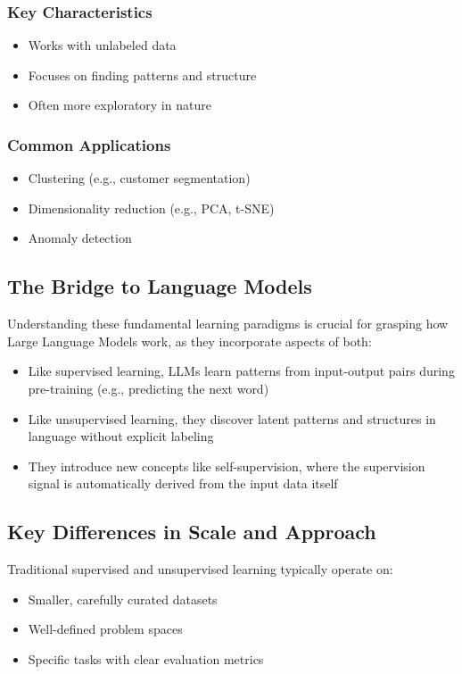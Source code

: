 \subsubsection{Key Characteristics}
\begin{itemize}[noitemsep]
    \item Works with unlabeled data
    \item Focuses on finding patterns and structure
    \item Often more exploratory in nature
\end{itemize}

\subsubsection{Common Applications}
\begin{itemize}[noitemsep]
    \item Clustering (e.g., customer segmentation)
    \item Dimensionality reduction (e.g., PCA, t-SNE)
    \item Anomaly detection
\end{itemize}

\subsection{The Bridge to Language Models}

Understanding these fundamental learning paradigms is crucial for grasping how Large Language Models work, as they incorporate aspects of both:

\begin{itemize}[noitemsep]
    \item Like supervised learning, LLMs learn patterns from input-output pairs during pre-training (e.g., predicting the next word)
    \item Like unsupervised learning, they discover latent patterns and structures in language without explicit labeling
    \item They introduce new concepts like self-supervision, where the supervision signal is automatically derived from the input data itself
\end{itemize}

\subsection{Key Differences in Scale and Approach}

Traditional supervised and unsupervised learning typically operate on:
\begin{itemize}[noitemsep]
    \item Smaller, carefully curated datasets
    \item Well-defined problem spaces
    \item Specific tasks with clear evaluation metrics
\end{itemize}

